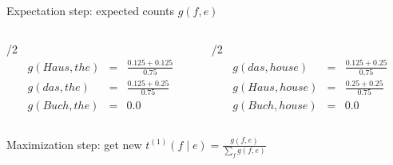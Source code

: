 \begin{frame}
\begin{block}{Expectation step: expected counts $g(f,e)$}
\begin{columns}
\begin{column}{\textwidth/2}
\[
\begin{array}{lcl}
g(Haus, the) & = & \frac{0.125 + 0.125}{0.75} \\
g(das, the) & = & \frac{0.125 + 0.25}{0.75} \\
g(Buch, the) & = & 0.0  
\end{array}
\]

\end{column}

\begin{column}{\textwidth/2}
\[
\begin{array}{lcl}
g(das, house) & = & \frac{0.125 + 0.25}{0.75} \\
g(Haus, house) & = & \frac{0.25 + 0.25}{0.75} \\
g(Buch, house) & = & 0.0 
 \end{array}
\]

\end{column}

\end{columns}

\end{block}\pause

\begin{block}{Maximization step: get new $t^{(1)}(f \mid e) = \frac{ g(f,e) }{ \sum_f g(f,e) } $}

\end{block}

\end{frame}

